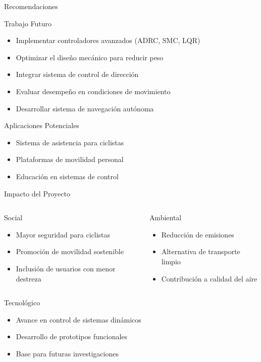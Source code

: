 \documentclass[10pt,xcolor={dvipsnames}]{beamer}
\begin{document}
\begin{frame}{Recomendaciones}
\begin{block}{Trabajo Futuro}
\begin{itemize}
    \item Implementar controladores avanzados (ADRC, SMC, LQR)
    \item Optimizar el diseño mecánico para reducir peso
    \item Integrar sistema de control de dirección
    \item Evaluar desempeño en condiciones de movimiento
    \item Desarrollar sistema de navegación autónoma
\end{itemize}
\end{block}

\begin{alertblock}{Aplicaciones Potenciales}
\begin{itemize}
    \item Sistema de asistencia para ciclistas
    \item Plataformas de movilidad personal
    \item Educación en sistemas de control
\end{itemize}
\end{alertblock}
\end{frame}

\begin{frame}{Impacto del Proyecto}
\begin{columns}
\begin{block}{Social}
\begin{itemize}
    \item Mayor seguridad para ciclistas
    \item Promoción de movilidad sostenible
    \item Inclusión de usuarios con menor destreza
\end{itemize}
\end{block}

\begin{block}{Ambiental}
\begin{itemize}
    \item Reducción de emisiones
    \item Alternativa de transporte limpio
    \item Contribución a calidad del aire
\end{itemize}
\end{block}
\end{columns}

\vspace{0.5cm}
\begin{block}{Tecnológico}
\begin{itemize}
    \item Avance en control de sistemas dinámicos
    \item Desarrollo de prototipos funcionales
    \item Base para futuras investigaciones
\end{itemize}
\end{block}
\end{frame}
\end{document}
